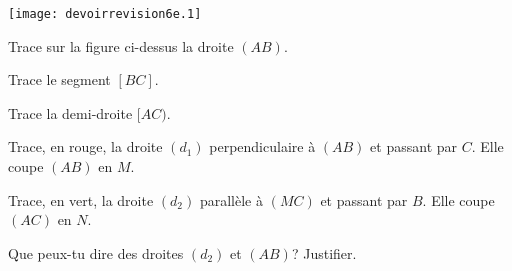 \begin{center}
  \texttt{[image: devoirrevision6e.1]}
\end{center}
\begin{myenumerate}
  \item Trace sur la figure ci-dessus la droite $(AB)$.
  \item Trace le segment $[BC]$.
  \item Trace la demi-droite $[AC)$.
  \item Trace, en rouge, la droite $(d_1)$ perpendiculaire à $(AB)$ et passant par $C$. Elle coupe $(AB)$ en $M$.
  \item Trace, en vert, la droite $(d_2)$ parallèle à $(MC)$ et passant par $B$. Elle coupe $(AC)$ en $N$.
  \item Que peux-tu dire des droites $(d_2)$ et $(AB)$? Justifier.
\end{myenumerate}